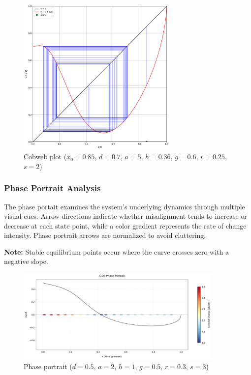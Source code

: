 \documentclass[a4paper, 10pt]{article}
\begin{document}
\begin{figure}[H]
	\centering
	\includegraphics[width=0.7\textwidth]{../images/results/cobweb.pdf}
	\caption{Cobweb plot ($x_0 = 0.85$, $d = 0.7$, $a = 5$, $h = 0.36$, $g = 0.6$, $r = 0.25$, $s = 2$)} %
	\label{fig:cobweb_plot}
\end{figure}

\subsubsection{Phase Portrait Analysis}
The phase portait examines the system's underlying dynamics through multiple visual cues. Arrow directions indicate whether misalignment tends to increase or decrease at each state point, while a color gradient represents the rate of change intensity.
Phase portrait arrows are normalized to avoid cluttering.

\textbf{Note:} Stable equilibrium points occur where the curve crosses zero with a negative slope.

\begin{figure}[H]
	\centering
	\includegraphics[width=0.9\textwidth]{../images/results/phase-portrait.pdf}
	\caption{Phase portrait ($d = 0.5$, $a = 2$, $h = 1$, $g = 0.5$, $r = 0.3$, $s = 3$)}
	\label{fig:phase_portrait}
\end{figure}
\end{document}
